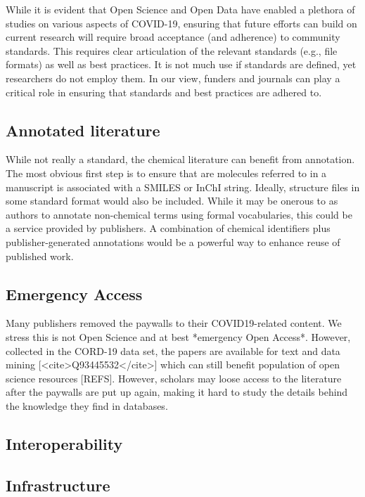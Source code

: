\documentclass{bmcart}
\begin{document}
While it is evident that Open Science and Open Data have enabled a
plethora of studies on various aspects of COVID-19, ensuring that
future efforts can build on current research will require broad
acceptance (and adherence) to community standards. This requires clear
articulation of the relevant standards (e.g., file formats) as well as
best practices. It is not much use if standards are defined, yet
researchers do not employ them. In our view, funders and journals can
play a critical role in ensuring that standards and best practices are
adhered to.

\subsection*{Annotated literature}

While not really a standard, the chemical literature can benefit from
annotation. The most obvious first step is to ensure that are
molecules referred to in a manuscript is associated with a SMILES or
InChI string. Ideally, structure files in some standard format would
also be included. While it may be onerous to as authors to annotate
non-chemical terms using formal vocabularies, this could be a service
provided by publishers. A combination of chemical identifiers plus
publisher-generated annotations would be a powerful way to enhance
reuse of published work.

\subsection*{Emergency Access}

Many publishers removed the paywalls to their COVID19-related content. We stress this is
not Open Science and at best *emergency Open Access*. However, collected in the CORD-19 data set,
the papers are available for text and data mining [<cite>Q93445532</cite>] which can still benefit
population of open science resources [REFS]. However, scholars may loose access to the literature
after the paywalls are put up again, making it hard to study the details behind the knowledge they
find in databases.


\subsection*{Interoperability}



\subsection*{Infrastructure}
\end{document}
